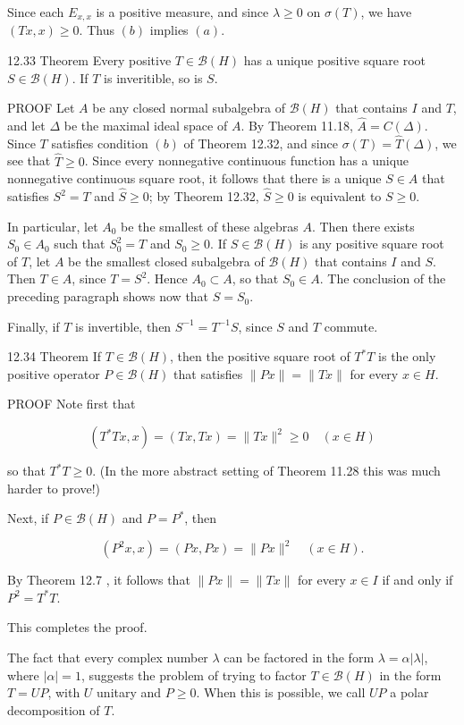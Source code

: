 \documentclass[10pt]{article}
\begin{document}
Since each $E_{x, x}$ is a positive measure, and since $\lambda \geq 0$ on $\sigma(T)$, we have $(T x, x) \geq 0$. Thus $(b)$ implies $(a)$.

12.33 Theorem Every positive $T \in \mathscr{B}(H)$ has a unique positive square root $S \in \mathscr{B}(H)$. If $T$ is inveritible, so is $S$.

PROOF Let $A$ be any closed normal subalgebra of $\mathscr{B}(H)$ that contains $I$ and $T$, and let $\Delta$ be the maximal ideal space of $A$. By Theorem 11.18, $\hat{A}=C(\Delta)$. Since $T$ satisfies condition $(b)$ of Theorem 12.32, and since $\sigma(T)=\hat{T}(\Delta)$, we see that $\hat{T} \geq 0$. Since every nonnegative continuous function has a unique nonnegative continuous square root, it follows that there is a unique $S \in A$ that satisfies $S^{2}=T$ and $\hat{S} \geq 0$; by Theorem 12.32, $\hat{S} \geq 0$ is equivalent to $S \geq 0$.

In particular, let $A_{0}$ be the smallest of these algebras $A$. Then there exists $S_{0} \in A_{0}$ such that $S_{0}^{2}=T$ and $S_{0} \geq 0$. If $S \in \mathscr{B}(H)$ is any positive square root of $T$, let $A$ be the smallest closed subalgebra of $\mathscr{B}(H)$ that contains $I$ and $S$. Then $T \in A$, since $T=S^{2}$. Hence $A_{0} \subset A$, so that $S_{0} \in A$. The conclusion of the preceding paragraph shows now that $S=S_{0}$.

Finally, if $T$ is invertible, then $S^{-1}=T^{-1} S$, since $S$ and $T$ commute.

12.34 Theorem If $T \in \mathscr{B}(H)$, then the positive square root of $T^{*} T$ is the only positive operator $P \in \mathscr{B}(H)$ that satisfies $\|P x\|=\|T x\|$ for every $x \in H$.

PROOF Note first that

$$
\left(T^{*} T x, x\right)=(T x, T x)=\|T x\|^{2} \geq 0 \quad(x \in H)
$$

so that $T^{*} T \geq 0$. (In the more abstract setting of Theorem 11.28 this was much harder to prove!)

Next, if $P \in \mathscr{B}(H)$ and $P=P^{*}$, then

$$
\left(P^{2} x, x\right)=(P x, P x)=\|P x\|^{2} \quad(x \in H) .
$$

By Theorem 12.7 , it follows that $\|P x\|=\|T x\|$ for every $x \in I$ if and only if $P^{2}=T^{*} T$.

This completes the proof.

The fact that every complex number $\lambda$ can be factored in the form $\lambda=\alpha|\lambda|$, where $|\alpha|=1$, suggests the problem of trying to factor $T \in \mathscr{B}(H)$ in the form $T=U P$, with $U$ unitary and $P \geq 0$. When this is possible, we call $U P$ a polar decomposition of $T$.
\end{document}
